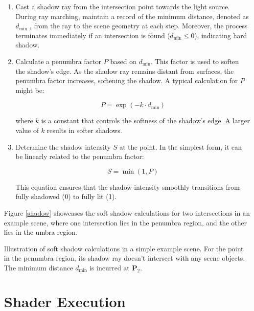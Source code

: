 \begin{enumerate}
    \item Cast a shadow ray from the intersection point towards the light source. During ray marching, maintain a record of the minimum distance, denoted as $d_{\text{min}}$ , from the ray to the scene geometry at each step. Moreover, the process terminates immediately if an intersection is found ($d_{\text{min}}\le 0$), indicating hard shadow.

    \item Calculate a penumbra factor $P$ based on $d_{\text{min}}$. This factor is used to soften the shadow's edge. As the shadow ray remains distant from surfaces, the penumbra factor increases, softening the shadow. A typical calculation for $P$ might be:

    \begin{equation}
       P = \exp(-k \cdot d_{\text{min}})
    \end{equation}

    where $k$ is a constant that controls the softness of the shadow's edge. A larger value of $k$ results in softer shadows.

    \item Determine the shadow intensity $S$ at the point. In the simplest form, it can be linearly related to the penumbra factor:

    \begin{equation}
    S = \min(1, P)
    \end{equation}

    This equation ensures that the shadow intensity smoothly transitions from fully shadowed (0) to fully lit (1).
\end{enumerate}

Figure \ref{shadow} showcases the soft shadow calculations for two intersections in an example scene, where one intersection lies in the penumbra region, and the other lies in the umbra region.

{Illustration of soft shadow calculations in a simple example scene. For the point in the penumbra region, its shadow ray doesn't intersect with any scene objects. The minimum distance $d_{\text{min}}$ is incurred at $\mathbf{P}_2$.
}


\section{Shader Execution}
\label{GPU}

